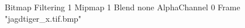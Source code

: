 {Bitmap
	{Filtering 1}
	{Mipmap 1}
	{Blend none}
	{AlphaChannel 0}
	{Frame "jagdtiger_x.tif.bmp"}
}
